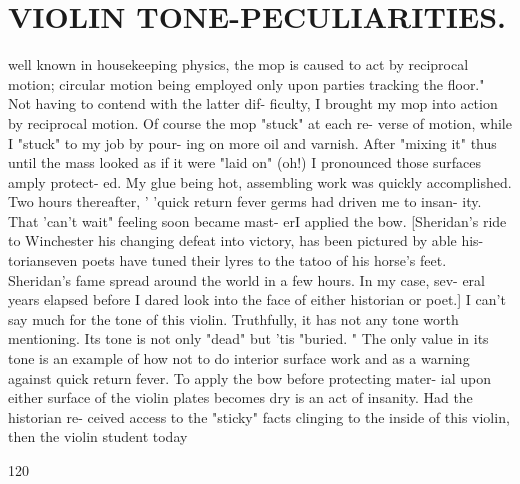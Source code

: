 \documentclass{article}
\begin{document}
\section*{VIOLIN TONE-PECULIARITIES.}
well known in housekeeping physics, the mop is caused to act by reciprocal motion; circular motion being employed only upon parties tracking the floor." Not having to contend with the latter dif- ficulty, I brought my mop into action by reciprocal motion. Of course the mop "stuck" at each re- verse of motion, while I "stuck" to my job by pour- ing on more oil and varnish. After "mixing it" thus until the mass looked as if it were "laid on" (oh!) I pronounced those surfaces amply protect- ed. My glue being hot, assembling work was quickly accomplished. Two hours thereafter, ' 'quick return fever germs had driven me to insan- ity. That 'can't wait" feeling soon became mast- erI applied the bow. [Sheridan's ride to Winchester his changing defeat into victory, has been pictured by able his- torianseven poets have tuned their lyres to the tatoo of his horse's feet. Sheridan's fame spread around the world in a few hours. In my case, sev- eral years elapsed before I dared look into the face of either historian or poet.] I can't say much for the tone of this violin. Truthfully, it has not any tone worth mentioning. Its tone is not only "dead" but 'tis "buried. " The only value in its tone is an example of how not to do interior surface work and as a warning against quick return fever. To apply the bow before protecting mater- ial upon either surface of the violin plates becomes dry is an act of insanity. Had the historian re- ceived access to the "sticky" facts clinging to the inside of this violin, then the violin student today

120
\end{document}
